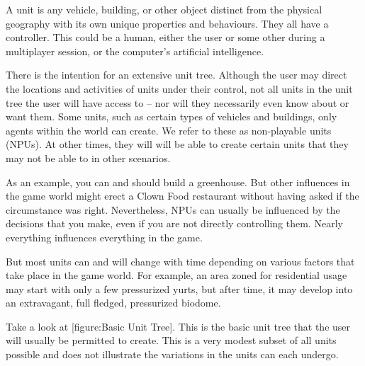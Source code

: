 

A unit is any vehicle, building, or other object distinct from the physical geography with its own unique properties and behaviours. They all have a controller. This could be a human, either the user or some other during a multiplayer session, or the computer's artificial intelligence.

There is the intention for an extensive unit tree. Although the user may direct the locations and activities of units under their control, not all units in the unit tree the user will have access to -- nor will they necessarily even know about or want them. Some units, such as certain types of vehicles and buildings, only agents within the world can create. We refer to these as non-playable units (NPUs). At other times, they will will be able to create certain units that they may not be able to in other scenarios.

As an example, you can and should build a greenhouse. But other influences in the game world might erect a Clown Food restaurant without having asked if the circumstance was right. Nevertheless, NPUs can usually be influenced by the decisions that you make, even if you are not directly controlling them. Nearly everything influences everything in the game.

But most units can and will change with time depending on various factors that take place in the game world. For example, an area zoned for residential usage may start with only a few pressurized yurts, but after time, it may develop into an extravagant, full fledged, pressurized biodome.

Take a look at [figure:Basic Unit Tree]. This is the basic unit tree that the user will usually be permitted to create. This is a very modest subset of all units possible and does not illustrate the variations in the units can each undergo.

    {}

